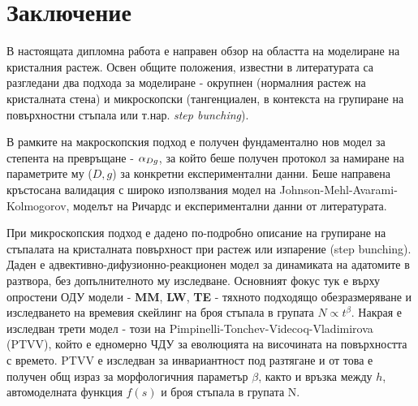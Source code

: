 \section{Заключение}
В настоящата дипломна работа е направен обзор на областта на моделиране на кристалния растеж. Освен общите положения, известни в литературата са разгледани два подхода за моделиране - окрупнен (нормалния растеж на кристалната стена) и микроскопски (тангенциален, в контекста на групиране на повърхностни стъпала или т.нар. \textit{step bunching}).

В рамките на макроскопския подход е получен фундаментално нов модел за степента на превръщане - $\alpha_{Dg}$, за който беше получен протокол за намиране на параметрите му ($D, g$) за конкретни експериментални данни. Беше направена кръстосана валидация с широко използвания модел на Johnson-Mehl-Avarami-Kolmogorov, моделът на Ричардс и експериментални данни от литературата.

При микроскопския подход е дадено по-подробно описание на групиране на стъпалата на кристалната повърхност при растеж или изпарение (step bunching). Даден е адвективно-дифузионно-реакционен модел за динамиката на адатомите в разтвора, без допълнителното му изследване. Основният фокус тук е върху опростени ОДУ модели - \textbf{MM}, \textbf{LW}, \textbf{TE} - тяхното подходящо обезразмеряване и изследването на времевия скейлинг на броя стъпала в групата $N \propto t^\beta$. Накрая е изследван трети модел - този на Pimpinelli-Tonchev-Videcoq-Vladimirova (PTVV), който е едномерно ЧДУ за еволюцията на височината на повърхността с времето. PTVV е изследван за инвариантност под разтягане и от това е получен общ израз за морфологичния параметър $\beta$, както и връзка между $h$, автомоделната функция $f(s)$ и броя стъпала в групата N.
